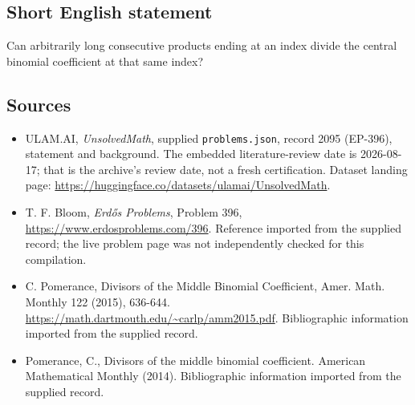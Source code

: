 \documentclass[11pt,a4paper]{article}
\begin{document}
\subsection{Short English statement}

Can arbitrarily long consecutive products ending at an index divide the central binomial coefficient at that same index?

\subsection{Sources}

{\small

\begin{itemize}

\item[\hypertarget{source:2095:1}{S1}] ULAM.AI, \emph{UnsolvedMath}, supplied \texttt{problems.json}, record 2095 (EP-396), statement and background. The embedded literature-review date is 2026-08-17; that is the archive’s review date, not a fresh certification. Dataset landing page: \url{https://huggingface.co/datasets/ulamai/UnsolvedMath}.

\item[\hypertarget{source:2095:2}{S2}] T. F. Bloom, \emph{Erdős Problems}, Problem 396, \url{https://www.erdosproblems.com/396}. Reference imported from the supplied record; the live problem page was not independently checked for this compilation.

\item[\hypertarget{source:2095:3}{S3}] C. Pomerance, Divisors of the Middle Binomial Coefficient, Amer. Math. Monthly 122 (2015), 636-644. \url{https://math.dartmouth.edu/~carlp/amm2015.pdf}. Bibliographic information imported from the supplied record.

\item[\hypertarget{source:2095:4}{S4}] Pomerance, C., Divisors of the middle binomial coefficient. American Mathematical Monthly (2014). Bibliographic information imported from the supplied record.

\end{itemize}

}

\label{end:2095}
\end{document}
